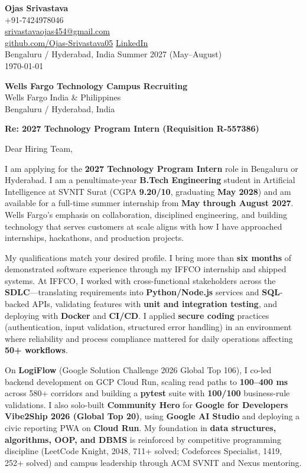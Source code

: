\documentclass[a4paper,11pt]{article}
\begin{document}
\begin{flushright}
\textbf{Ojas Srivastava} \\
+91-7424978046 \\
\href{mailto:srivastavaojas454@gmail.com}{srivastavaojas454@gmail.com} \\
\href{https://github.com/Ojas-Srivastava05}{github.com/Ojas-Srivastava05} \textbar{}
\href{https://linkedin.com/in/ojas-srivastava05}{LinkedIn} \\
Bengaluru / Hyderabad, India \textbar{} Summer 2027 (May--August) \\
\today
\end{flushright}

\vspace{4mm}
\textbf{Wells Fargo Technology Campus Recruiting} \\
Wells Fargo India \& Philippines \\
Bengaluru / Hyderabad, India

\vspace{2mm}
\textbf{Re: 2027 Technology Program Intern (Requisition R-557386)}

Dear Hiring Team,

I am applying for the \textbf{2027 Technology Program Intern} role in Bengaluru or Hyderabad. I am a penultimate-year \textbf{B.Tech Engineering} student in Artificial Intelligence at SVNIT Surat (CGPA \textbf{9.20/10}, graduating \textbf{May 2028}) and am available for a full-time summer internship from \textbf{May through August 2027}. Wells Fargo's emphasis on collaboration, disciplined engineering, and building technology that serves customers at scale aligns with how I have approached internships, hackathons, and production projects.

My qualifications match your desired profile. I bring more than \textbf{six months} of demonstrated software experience through my IFFCO internship and shipped systems. At IFFCO, I worked with cross-functional stakeholders across the \textbf{SDLC}---translating requirements into \textbf{Python/Node.js} services and \textbf{SQL}-backed APIs, validating features with \textbf{unit and integration testing}, and deploying with \textbf{Docker} and \textbf{CI/CD}. I applied \textbf{secure coding} practices (authentication, input validation, structured error handling) in an environment where reliability and process compliance mattered for daily operations affecting \textbf{50+ workflows}.

On \textbf{LogiFlow} (Google Solution Challenge 2026 Global Top 106), I co-led backend development on GCP Cloud Run, scaling read paths to \textbf{100--400 ms} across 580+ corridors and building a \textbf{pytest} suite with \textbf{100/100} business-rule validations. I also solo-built \textbf{Community Hero} for \textbf{Google for Developers Vibe2Ship 2026 (Global Top 20)}, using \textbf{Google AI Studio} and deploying a civic reporting PWA on \textbf{Cloud Run}. My foundation in \textbf{data structures, algorithms, OOP, and DBMS} is reinforced by competitive programming discipline (LeetCode Knight, 2048, 711+ solved; Codeforces Specialist, 1419, 252+ solved) and campus leadership through ACM SVNIT and Nexus mentoring.
\end{document}
